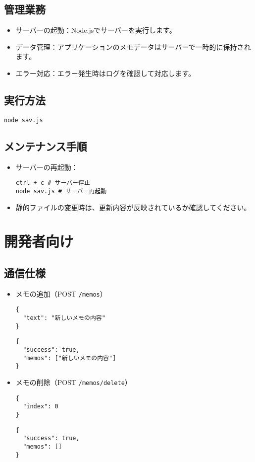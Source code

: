 \documentclass[uplatex,dvipdfmx]{jsarticle}
\begin{document}
\subsection{管理業務}
\begin{itemize}
    \item サーバーの起動：Node.jsでサーバーを実行します。
    \item データ管理：アプリケーションのメモデータはサーバーで一時的に保持されます。
    \item エラー対応：エラー発生時はログを確認して対応します。
\end{itemize}

\subsection{実行方法}
\begin{lstlisting}[caption=サーバーの起動コマンド]
node sav.js
\end{lstlisting}

\subsection{メンテナンス手順}
\begin{itemize}
    \item サーバーの再起動：
    \begin{lstlisting}
ctrl + c # サーバー停止
node sav.js # サーバー再起動
    \end{lstlisting}
    \item 静的ファイルの変更時は、更新内容が反映されているか確認してください。
\end{itemize}

\section{開発者向け}
\subsection{通信仕様}
\begin{itemize}
    \item メモの追加（POST \texttt{/memos}）
    \begin{lstlisting}[caption=リクエスト例]
{
  "text": "新しいメモの内容"
}
    \end{lstlisting}

    \begin{lstlisting}[caption=レスポンス例]
{
  "success": true,
  "memos": ["新しいメモの内容"]
}
    \end{lstlisting}

    \item メモの削除（POST \texttt{/memos/delete}）
    \begin{lstlisting}[caption=リクエスト例]
{
  "index": 0
}
    \end{lstlisting}

    \begin{lstlisting}[caption=レスポンス例]
{
  "success": true,
  "memos": []
}
    \end{lstlisting}
\end{itemize}
\end{document}
